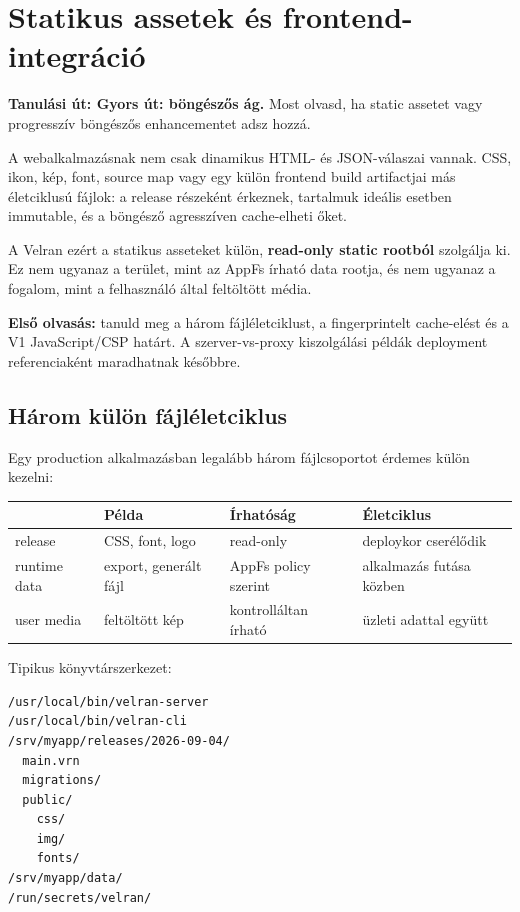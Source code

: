 \chapter{Statikus assetek és frontend-integráció}

\noindent\textbf{Tanulási út: Gyors út: böngészős ág.} Most olvasd, ha static assetet vagy progresszív böngészős enhancementet adsz hozzá.\par\medskip

A webalkalmazásnak nem csak dinamikus HTML- és JSON-válaszai vannak. CSS, ikon, kép, font, source map vagy egy külön frontend build artifactjai más életciklusú fájlok: a release részeként érkeznek, tartalmuk ideális esetben immutable, és a böngésző agresszíven cache-elheti őket.

A Velran ezért a statikus asseteket külön, \textbf{read-only static rootból} szolgálja ki. Ez nem ugyanaz a terület, mint az AppFs írható data rootja, és nem ugyanaz a fogalom, mint a felhasználó által feltöltött média.

\noindent\textbf{Első olvasás:} tanuld meg a három fájléletciklust, a fingerprintelt cache-elést és a V1 JavaScript/CSP határt. A szerver-vs-proxy kiszolgálási példák deployment referenciaként maradhatnak későbbre.

\section{Három külön fájléletciklus}

Egy production alkalmazásban legalább három fájlcsoportot érdemes külön kezelni:

\begin{center}
\begin{tabularx}{\textwidth}{@{}lYYY@{}}
\toprule
 & Példa & Írhatóság & Életciklus \\
\midrule
release & CSS, font, logo & read-only & deploykor cserélődik \\
runtime data & export, generált fájl & AppFs policy szerint & alkalmazás futása közben \\
user media & feltöltött kép & kontrolláltan írható & üzleti adattal együtt \\
\bottomrule
\end{tabularx}
\end{center}

Tipikus könyvtárszerkezet:

\begin{lstlisting}
/usr/local/bin/velran-server
/usr/local/bin/velran-cli
/srv/myapp/releases/2026-09-04/
  main.vrn
  migrations/
  public/
    css/
    img/
    fonts/
/srv/myapp/data/
/run/secrets/velran/
\end{lstlisting}

